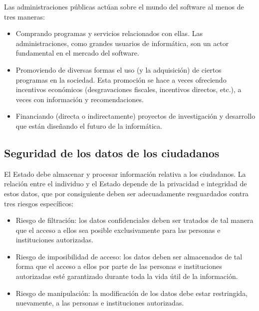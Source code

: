 Las administraciones públicas actúan sobre el mundo del software al menos de tres maneras:

\begin{itemize}

\item Comprando programas y servicios relacionados con ellas. Las administraciones, como grandes usuarios de informática, son un actor fundamental en el mercado del software.

\item Promoviendo de diversas formas el uso (y la adquisición) de ciertos programas en la sociedad. Esta promoción se hace a veces ofreciendo incentivos económicos (desgravaciones fiscales, incentivos directos, etc.), a veces con información y recomendaciones.

\item Financiando (directa o indirectamente) proyectos de investigación y desarrollo que están diseñando el futuro de la informática.

\end{itemize}

\subsection{Seguridad de los datos de los ciudadanos}

El Estado debe almacenar y procesar información relativa a los ciudadanos. La relación entre el individuo y el Estado depende de la privacidad e integridad de estos datos, que por consiguiente deben ser adecuadamente resguardados contra tres riesgos específicos:
 
\begin{itemize}
\item  Riesgo de filtración: los datos confidenciales deben ser tratados de tal manera que el acceso a ellos sea posible exclusivamente para las personas e instituciones autorizadas.

\item Riesgo de imposibilidad de acceso: los datos deben ser almacenados de tal forma que el acceso a ellos por parte de las personas e instituciones autorizadas esté garantizado durante toda la vida útil de la información.

\item Riesgo de manipulación: la modificación de los datos debe estar restringida, nuevamente, a las personas e instituciones autorizadas.
\end{itemize}

